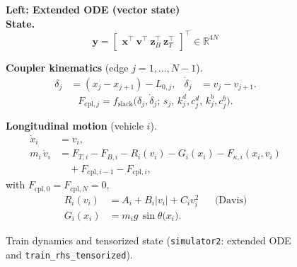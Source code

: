 \documentclass[11pt]{article}
\begin{document}
\begin{figure}[t]
  \centering
  \caption{Train dynamics and tensorized state (\texttt{simulator2}: extended ODE and \texttt{train\_rhs\_tensorized}).}
  \label{fig:train-dynamics-tensor}

  \footnotesize\raggedright
  \begin{minipage}[t]{0.47\textwidth}
    \textbf{Left: Extended ODE (vector state)}\\[0.25em]
    \textbf{State.}
    \begin{equation*}
      \bm{y} =
      \begin{bmatrix}
        \bm{x}^\top\ \bm{v}^\top\ \bm{z}_B^\top\ \bm{z}_T^\top
      \end{bmatrix}^{\!\top}
      \in \mathbb{R}^{4N}
    \end{equation*}

    \textbf{Coupler kinematics} (edge $j=1,\ldots,N-1$).
    \begin{align*}
      \delta_j &= (x_j - x_{j+1}) - L_{0,j}, &
      \dot{\delta}_j &= v_j - v_{j+1}.
    \end{align*}
    \vspace{-0.35em}
    \begin{equation*}
      F_{\mathrm{cpl},j} =
      f_{\mathrm{slack}}\bigl(\delta_j,\dot{\delta}_j;\,
      s_j,\, k^d_j,c^d_j,\, k^b_j,c^b_j\bigr).
    \end{equation*}

    \textbf{Longitudinal motion} (vehicle $i$).
    \begin{align*}
      \dot{x}_i &= v_i, \\
      m_i\,\dot{v}_i
      &= F_{T,i} - F_{B,i} - R_i(v_i) - G_i(x_i) - F_{\kappa,i}(x_i,v_i) \\
      &\quad{}+ F_{\mathrm{cpl},i-1} - F_{\mathrm{cpl},i},
    \end{align*}
    with $F_{\mathrm{cpl},0}=F_{\mathrm{cpl},N}=0$,
    \begin{align*}
      R_i(v_i) &= A_i + B_i\lvert v_i\rvert + C_i v_i^2 && \text{(Davis)} \\
      G_i(x_i) &= m_i g\,\sin\theta\bigl(x_i\bigr). &&
    \end{align*}


\end{minipage}
\end{figure}
\end{document}
